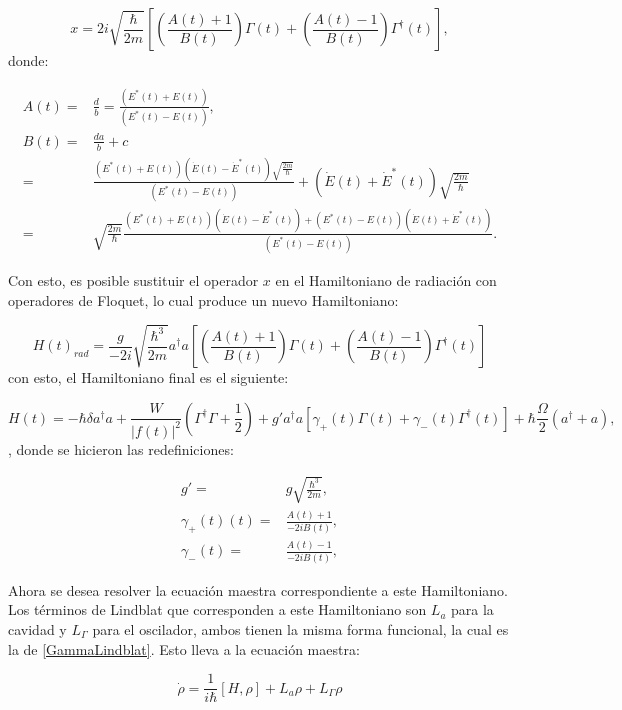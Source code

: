 \documentclass[a4paper,10pt]{report}
\begin{document}
\begin{equation}
x = 2i \sqrt{\frac{\hbar}{2m}}[(\frac{A(t) +1}{B(t)})\Gamma (t) +(\frac{A(t) -1}{B(t)})\Gamma^\dagger (t)],
\end{equation} donde:

\begin{align}
A(t) =& \frac{d}{b} = \frac{(E^* (t) + E (t))}{(E^* (t) - E (t))}, \\
B(t) = & \frac{da}{b}+c \\
=& \frac{(E^* (t) + E (t))(\dot{E} (t) - \dot{E}^* (t)) \sqrt{\frac{2m}{\hbar}}}{(E^* (t) - E (t))} + (\dot{E} (t) + \dot{E}^* (t)) \sqrt{\frac{2m}{\hbar}}\\
=&\sqrt{\frac{2m}{\hbar}}\frac{(E^* (t) + E (t))(\dot{E} (t) - \dot{E}^* (t))+(E^* (t) - E (t))(\dot{E} (t) + \dot{E}^* (t))}{(E^* (t) - E (t))}.
\end{align}

Con esto, es posible sustituir el operador $x$ en el Hamiltoniano de radiación con operadores de Floquet, lo cual produce un nuevo Hamiltoniano:

\begin{equation}
H(t)_{rad} = \frac{g}{-2i}\sqrt{\frac{\hbar^3}{2m}}  a^\dagger a[(\frac{A(t) +1}{B(t)})\Gamma (t) +(\frac{A(t) -1}{B(t)})\Gamma^\dagger (t)]
\end{equation} con esto, el Hamiltoniano final es el siguiente:

\begin{equation}\label{LaserCoolingHamiltonian}
H(t) = -\hbar \delta a^\dagger a + \frac{W}{|f(t)|^2}(\Gamma^\dagger \Gamma + \frac{1}{2}) +  g'a^\dagger a[\gamma_+(t)\Gamma (t) +\gamma_-(t)\Gamma^\dagger (t)] + \hbar\frac{\Omega}{2}(a^\dagger + a),
\end{equation}, donde se hicieron las redefiniciones:

\begin{align*}
g'=&g\sqrt{\frac{\hbar^3}{2m}},\\
\gamma_+(t)(t)=&\frac{A(t) +1}{-2iB(t)},\\
\gamma_-(t)=&\frac{A(t) -1}{-2iB(t)},
\end{align*} 

Ahora se desea resolver la ecuación maestra correspondiente a este Hamiltoniano. Los términos de Lindblat que corresponden a este Hamiltoniano son $L_a$ para la cavidad y $L_\Gamma$ para el oscilador, ambos tienen la misma forma funcional, la cual es la de \ref{GammaLindblat}. Esto lleva a la ecuación maestra:

\begin{equation}\label{LCMasterEquation}
\dot{\rho} = \frac{1}{i\hbar}[H,\rho] + L_a\rho + L_\Gamma \rho
\end{equation}
\end{document}
